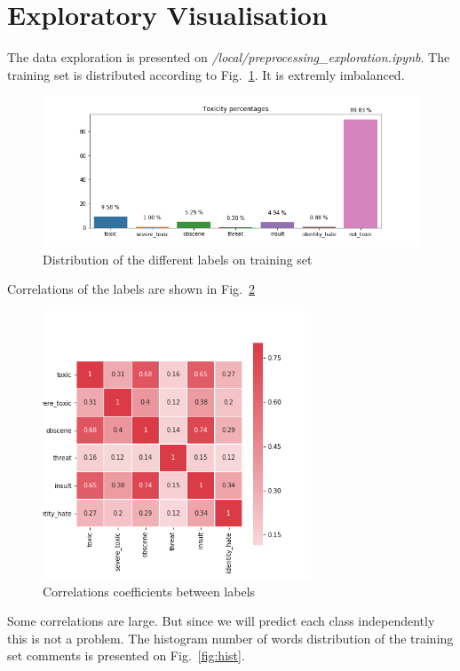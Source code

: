 \documentclass{report}
\begin{document}
\section{Exploratory Visualisation}


The data exploration is presented on \emph{/local/preprocessing\_exploration.ipynb}. 
The training set is distributed according to Fig.~\ref{fig:bar_plot}. It is extremly imbalanced. 
\begin{figure}[!h]
  \includegraphics[width=\textwidth]{../local/plots_tables/bar_plot.png}
  \caption{Distribution of the different labels on training set}
  \label{fig:bar_plot}
\end{figure}
Correlations of the labels are shown in Fig.~\ref{fig:corr}
\begin{figure}[!h]
\centering
  \includegraphics[width=80mm]{../local/plots_tables/corr.png}
  \caption{Correlations coefficients between labels}
  \label{fig:corr}
\end{figure}
Some correlations are large. But since we will predict each class independently this is not a problem. The histogram number of words distribution of the training set comments is presented on Fig.~\ref{fig:hist}. 
\end{document}
